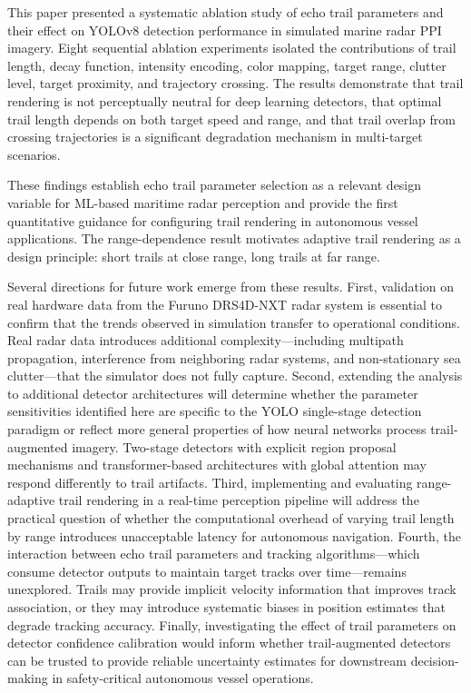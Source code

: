 \documentclass[twocolumn, 10pt]{article}
\begin{document}
This paper presented a systematic ablation study of echo trail parameters and their effect on YOLOv8 detection performance in simulated marine radar PPI imagery. Eight sequential ablation experiments isolated the contributions of trail length, decay function, intensity encoding, color mapping, target range, clutter level, target proximity, and trajectory crossing. The results demonstrate that trail rendering is not perceptually neutral for deep learning detectors, that optimal trail length depends on both target speed and range, and that trail overlap from crossing trajectories is a significant degradation mechanism in multi-target scenarios.

These findings establish echo trail parameter selection as a relevant design variable for ML-based maritime radar perception and provide the first quantitative guidance for configuring trail rendering in autonomous vessel applications. The range-dependence result motivates adaptive trail rendering as a design principle: short trails at close range, long trails at far range.

Several directions for future work emerge from these results. First, validation on real hardware data from the Furuno DRS4D-NXT radar system is essential to confirm that the trends observed in simulation transfer to operational conditions. Real radar data introduces additional complexity---including multipath propagation, interference from neighboring radar systems, and non-stationary sea clutter---that the simulator does not fully capture. Second, extending the analysis to additional detector architectures will determine whether the parameter sensitivities identified here are specific to the YOLO single-stage detection paradigm or reflect more general properties of how neural networks process trail-augmented imagery. Two-stage detectors with explicit region proposal mechanisms and transformer-based architectures with global attention may respond differently to trail artifacts. Third, implementing and evaluating range-adaptive trail rendering in a real-time perception pipeline will address the practical question of whether the computational overhead of varying trail length by range introduces unacceptable latency for autonomous navigation. Fourth, the interaction between echo trail parameters and tracking algorithms---which consume detector outputs to maintain target tracks over time---remains unexplored. Trails may provide implicit velocity information that improves track association, or they may introduce systematic biases in position estimates that degrade tracking accuracy. Finally, investigating the effect of trail parameters on detector confidence calibration would inform whether trail-augmented detectors can be trusted to provide reliable uncertainty estimates for downstream decision-making in safety-critical autonomous vessel operations.



\end{document}
